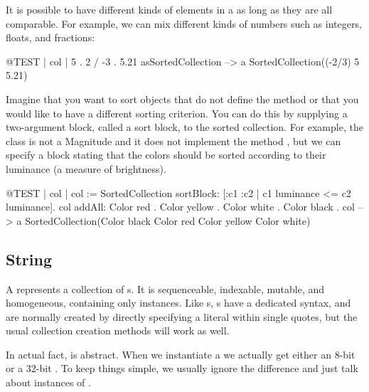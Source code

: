 \documentclass[a4paper,10pt,twoside]{book}
\begin{document}
It is possible to have different kinds of elements in a  as long as they are all comparable.
For example, we can mix different kinds of numbers such as integers, floats, and fractions:
\begin{code}{@TEST | col |}
{5 . 2 / -3 . 5.21} asSortedCollection --> a SortedCollection((-2/3) 5 5.21)
\end{code}

Imagine that you want to sort objects that do not define the method \ct{<=} or that you would like to have a different sorting criterion.
You can do this by supplying a two-argument block, called a sort block, to the sorted collection.
For example, the class  is not a Magnitude and it does not implement the method \ct{<=}, but we can specify a block stating that the colors should be sorted according to their luminance (a measure of brightness).

\begin{code}{@TEST | col |}
col := SortedCollection sortBlock: [:c1 :c2 | c1 luminance <= c2 luminance].
col addAll: { Color red . Color yellow . Color white . Color black }.
col --> a SortedCollection(Color black Color red Color yellow Color white)
\end{code}

\subsection{String}
A \st {} represents a collection of s.
It is sequenceable, indexable, mutable, and homogeneous, containing only  instances.
Like s, s have a dedicated syntax, and are normally created by directly specifying a  literal within single quotes, but the usual collection creation methods will work as well.


In actual fact,  is abstract.
When we instantiate a  we actually get either an 8-bit  or a 32-bit .
To keep things simple, we usually ignore the difference and just talk about instances of .
\end{document}
